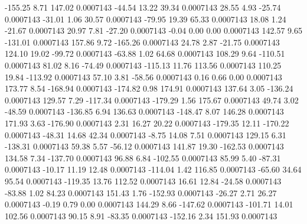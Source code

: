      -155.25        8.71      147.02     0.0007143
      -44.54       13.22       39.34     0.0007143
       28.55        4.93      -25.74     0.0007143
      -31.01        1.06       30.57     0.0007143
      -79.95       19.39       65.33     0.0007143
       18.08        1.24      -21.67     0.0007143
       20.97        7.81      -27.20     0.0007143
       -0.04        0.00        0.00     0.0007143
      142.57        9.65     -131.01     0.0007143
      157.86        9.72     -165.26     0.0007143
       24.78        2.87      -21.75     0.0007143
      124.10       19.02      -99.72     0.0007143
      -63.88        1.02       64.68     0.0007143
      108.29        9.64     -110.51     0.0007143
       81.02        8.16      -74.49     0.0007143
     -115.13       11.76      113.56     0.0007143
      110.25       19.84     -113.92     0.0007143
       57.10        3.81      -58.56     0.0007143
        0.16        0.66        0.00     0.0007143
      173.77        8.54     -168.94     0.0007143
     -174.82        0.98      174.91     0.0007143
      137.64        3.05     -136.24     0.0007143
      129.57        7.29     -117.34     0.0007143
     -179.29        1.56      175.67     0.0007143
       49.74        3.02      -48.59     0.0007143
     -136.85        6.94      136.63     0.0007143
     -148.47        8.07      146.28     0.0007143
      171.93        3.63     -176.90     0.0007143
        2.31       16.27       20.22     0.0007143
     -179.35       12.11     -170.22     0.0007143
      -48.31       14.68       42.34     0.0007143
       -8.75       14.08        7.51     0.0007143
      129.15        6.31     -138.31     0.0007143
       59.38        5.57      -56.12     0.0007143
      141.87       19.30     -162.53     0.0007143
      134.58        7.34     -137.70     0.0007143
       96.88        6.84     -102.55     0.0007143
       85.99        5.40      -87.31     0.0007143
      -10.17       11.19       12.48     0.0007143
     -114.04        1.42      116.85     0.0007143
      -65.60       34.64       95.54     0.0007143
     -119.35       13.76      112.52     0.0007143
       16.61       12.84      -24.58     0.0007143
      -83.88        1.02       84.23     0.0007143
      151.43        1.76     -152.93     0.0007143
      -26.27        2.71       26.27     0.0007143
       -0.19        0.79        0.00     0.0007143
      144.29        8.66     -147.62     0.0007143
     -101.71       14.01      102.56     0.0007143
       90.15        8.91      -83.35     0.0007143
     -152.16        2.34      151.93     0.0007143
